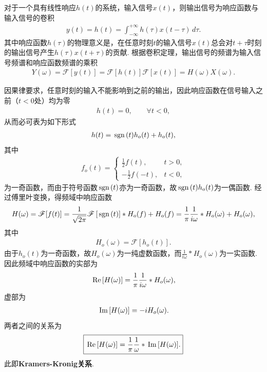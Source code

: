 \documentclass{assignment}
\begin{document}
对于一个具有线性响应$h(t)$的系统，输入信号$x(t)$，则输出信号为响应函数与输入信号的卷积
\begin{align}
    y(t)=h(t)=\int_{-\infty}^{+\infty}h(\tau)x(t-\tau)\,d\tau.
\end{align}
其中响应函数$h(\tau)$的物理意义是，在任意时刻$t$的输入信号$x(t)$总会对$t+\tau$时刻的输出信号产生$h(\tau)x(t+\tau)$的贡献.
根据卷积定理，输出信号的频谱为输入信号频谱和响应函数频谱的乘积
\begin{align}
    Y(\omega)=\mathscr{F}[y(t)]=\mathscr{F}[h(t)]\mathscr{F}[x(t)]=H(\omega)X(\omega).
\end{align}

因果律要求，任意时刻的输入不能影响到之前的输出，因此响应函数在信号输入之前（$t<0$处）均为零
\begin{align}
    h(t)=0,\qquad\forall t<0,
\end{align}
从而必可表为如下形式
\begin{align}
    h(t)=\,\text{sgn}\,(t)h_o(t)+h_o(t),
\end{align}
其中
\begin{align}
    f_o(t)=\left\{\begin{array}{ll}
        \frac{1}{2}f(t),&t>0,\\
        -\frac{1}{2}f(-t),&t<0,
    \end{array}\right.
\end{align}
为一奇函数，而由于符号函数$\,\text{sgn}\,(t)$亦为一奇函数，故$\,\text{sgn}\,(t)h_o(t)$为一偶函数. 经过傅里叶变换，得频域中响应函数
\begin{align}
    H(\omega)=\mathscr{F}[f(t)]=\frac{1}{\sqrt{2\pi}}\mathscr{F}\left[\,\text{sgn}\,(t)\right]*H_o(f)+H_o(f)=\frac{1}{\pi}\frac{1}{i\omega}*H_o(\omega)+H_o(\omega),
\end{align}
其中
\begin{align}
    H_o(\omega)=\mathscr{F}[h_o(t)].
\end{align}
由于$h_o(t)$为一奇函数，故$H_o(\omega)$为一纯虚数函数，而$\frac{1}{i\omega}*H_o(\omega)$为一实函数. 因此频域中响应函数的实部为
\begin{align}
    \,\text{Re}\,[H(\omega)]=\frac{1}{\pi}\frac{1}{i\omega}*H_o(\omega),
\end{align}
虚部为
\begin{align}
    \,\text{Im}\,[H(\omega)]=-iH_o(\omega).
\end{align}
两者之间的关系为
\begin{align}
    \boxed{\,\text{Re}\,[H(\omega)]=\frac{1}{\pi}\frac{1}{\omega}*\,\text{Im}\,[H(\omega)].}
\end{align}
此即\textbf{Kramers-Kronig关系}.
\end{document}
